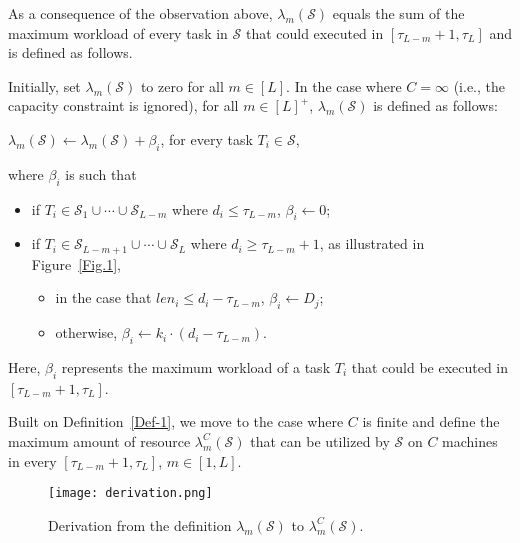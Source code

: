 \documentclass[10pt,journal,compsoc]{IEEEtran}
\begin{document}
As a consequence of the observation above, $\lambda_{m}(\mathcal{S})$ equals the sum of the maximum workload of every task in $\mathcal{S}$ that could executed in $[\tau_{L-m}+1, \tau_{L}]$ and is defined as follows.
\begin{definition}\label{Def-1}
Initially, set $\lambda_{m}(\mathcal{S})$ to zero for all $m\in [L]$. In the case where $C=\infty$ (i.e., the capacity constraint is ignored), for all $m\in[L]^{+}$, $\lambda_{m}(\mathcal{S})$ is defined as follows:
\begin{center}
$\lambda_{m}(\mathcal{S})\leftarrow \lambda_{m}(\mathcal{S})+\beta_{i}$, for every task $T_{i}\in\mathcal{S}$,
\end{center}
where $\beta_{i}$ is such that
\begin{itemize}
  \setlength\itemsep{0.2em}


\item if $T_{i}\in\mathcal{S}_{1}\cup\cdots\cup \mathcal{S}_{L-m}$ where $d_{i}\leq \tau_{L-m}$, $\beta_{i}\leftarrow 0$;

\item if $T_{i}\in\mathcal{S}_{L-m+1}\cup\cdots\cup \mathcal{S}_{L}$ where $d_{i}\geq \tau_{L-m}+1$, as illustrated in Figure~\ref{Fig.1},

\begin{itemize}
  \setlength\itemsep{0.25em}
\item in the case that $len_{i} \leq d_{i}-\tau_{L-m}$, $\beta_{i} \leftarrow D_{j}$;

\item otherwise, $\beta_{i} \leftarrow k_{i}\cdot(d_{i}-\tau_{L-m})$.
\end{itemize}
\end{itemize}
Here, $\beta_{i}$ represents the maximum workload of a task $T_{i}$ that could be executed in $[\tau_{L-m}+1, \tau_{L}]$.
\end{definition}






Built on Definition~\ref{Def-1}, we move to the case where $C$ is finite and define the maximum amount of resource $\lambda_{m}^{C}(\mathcal{S})$ that can be utilized by $\mathcal{S}$ on $C$ machines in every $[\tau_{L-m}+1, \tau_{L}]$, $m\in [1, L]$.





\begin{figure}[!ht]\centering

\texttt{[image: derivation.png]}

  \caption{Derivation from the definition $\lambda_{m}(\mathcal{S})$ to $\lambda_{m}^{C}(\mathcal{S})$.}\label{Fig.2}
\end{figure}
\end{document}
